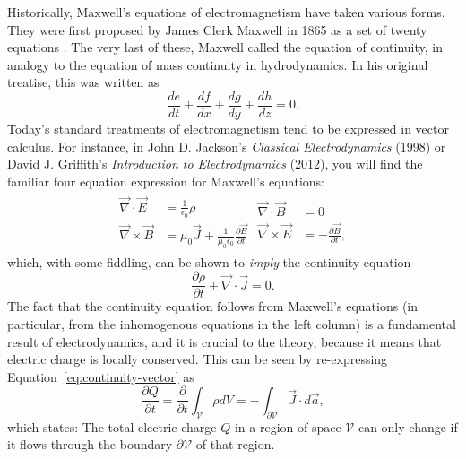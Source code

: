 \documentclass[twocolumn,notitlepage,nofootinbib,tightenlines]{revtex4-1}
\theoremstyle{definition}
\theoremstyle{remark}
\numberwithin{equation}{section}
\begin{document}
Historically, Maxwell's equations of electromagnetism have taken various forms. They were first proposed by James Clerk Maxwell in 1865 as a set of twenty equations \cite{maxwell}. The very last of these, Maxwell called the equation of continuity, in analogy to the equation of mass continuity in hydrodynamics. In his original treatise, this was written as
%
\begin{equation}\label{eq:continuity-1864}
    \frac{de}{dt} + \frac{df}{dx} + \frac{dg}{dy} + \frac{dh}{dz} = 0.
\end{equation}
%
Today's standard treatments of electromagnetism tend to be expressed in vector calculus. For instance, in John D. Jackson's \emph{Classical Electrodynamics} (1998) or David J. Griffith's \emph{Introduction to Electrodynamics} (2012), you will find the familiar four equation expression for Maxwell's equations:
%
\begin{align}\label{eq:maxwell-vector}
    \begin{split}
        \vec \nabla \cdot \vec E &= \frac{1}{\epsilon_0} \rho\\
        \vec \nabla \times \vec B &= \mu_0 \vec J + \frac{1}{\mu_0 \epsilon_0} \frac{\partial \vec E}{\partial t}
    \end{split}
    \begin{split}
        \vec \nabla \cdot \vec B &= 0\\
        \vec \nabla \times \vec E &= - \frac{\partial \vec B}{\partial t},
    \end{split}
\end{align}
%
which, with some fiddling, can be shown to \emph{imply} the continuity equation
%
\begin{equation}\label{eq:continuity-vector}
    \frac{\partial \rho}{\partial t} + \vec \nabla \cdot \vec J = 0.
\end{equation}
%
The fact that the continuity equation follows from Maxwell's equations (in particular, from the inhomogenous equations in the left column) is a fundamental result of electrodynamics, and it is crucial to the theory, because it means that electric charge is locally conserved. This can be seen by re-expressing Equation~\ref{eq:continuity-vector} as
%
\begin{equation}
  \frac{\partial Q}{\partial t} = \frac{\partial}{\partial t} \int_\mathcal{V} \rho dV = - \int_{\partial\mathcal{V}} \vec J \cdot d \vec a,
\end{equation}
%
which states: The total electric charge $Q$ in a region of space $\mathcal{V}$ can only change if it flows through the boundary $\partial \mathcal{V}$ of that region.
\end{document}
